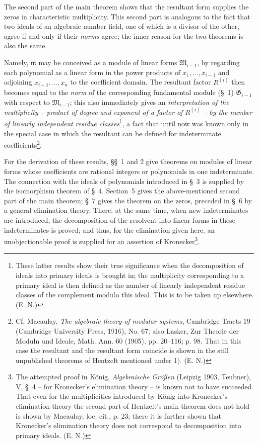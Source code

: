 \documentclass[11pt]{article}
\newcommand{\Gmod}{\mathfrak G}
\newcommand{\mideal}{\mathfrak m}
\begin{document}
The second part of the main theorem shows that the resultant form supplies the zeros in characteristic multiplicity. This second part is analogous to the fact that two ideals of an algebraic number field, one of which is a divisor of the other, agree if and only if their \emph{norms} agree; the inner reason for the two theorems is also the same.

Namely, $\mideal$ may be conceived as a module of linear forms $\mathfrak M_{i-1}$, by regarding each polynomial as a linear form in the power products of $x_1,\ldots,x_{i-1}$ and adjoining $x_{i+1},\ldots,x_n$ to the coefficient domain. The resultant factor $R^{(i)}$ then becomes equal to the \emph{norm} of the corresponding fundamental module (§~1) $\Gmod_{i-1}$ with respect to $\mathfrak M_{i-1}$; this also immediately gives an \emph{interpretation of the multiplicity -- product of degree and exponent of a factor of $R^{(i)}$ -- by the number of linearly independent residue classes}\footnote{These latter results show their true significance when the decomposition of ideals into primary ideals is brought in; the multiplicity corresponding to a primary ideal is then defined as the number of linearly independent residue classes of the complement modulo this ideal. This is to be taken up elsewhere. (E. N.)}, a fact that until now was known only in the special case in which the resultant can be defined for indeterminate coefficients\footnote{Cf. Macaulay, \emph{The algebraic theory of modular systems}, Cambridge Tracts 19 (Cambridge University Press, 1916), No. 67; also Lasker, Zur Theorie der Moduln und Ideale, Math. Ann. 60 (1905), pp. 20--116; p. 98. That in this case the resultant and the resultant form coincide is shown in the still unpublished theorems of Hentzelt mentioned under 1). (E. N.)}.

For the derivation of these results, §§~1 and 2 give theorems on modules of linear forms whose coefficients are rational integers or polynomials in one indeterminate. The connection with the ideals of polynomials introduced in §~3 is supplied by the isomorphism theorem of §~4. Section~5 gives the above-mentioned second part of the main theorem; §~7 gives the theorem on the zeros, preceded in §~6 by a general elimination theory. There, at the same time, when new indeterminates are introduced, the decomposition of the resolvent into linear forms in these indeterminates is proved; and thus, for the elimination given here, an unobjectionable proof is supplied for an assertion of Kronecker\footnote{The attempted proof in König, \emph{Algebraische Größen} (Leipzig 1903, Teubner), V, §~4 -- for Kronecker's elimination theory -- is known not to have succeeded. That even for the multiplicities introduced by König into Kronecker's elimination theory the second part of Hentzelt's main theorem does not hold is shown by Macaulay, loc. cit., p. 23; there it is further shown that Kronecker's elimination theory does not correspond to decomposition into primary ideals. (E. N.)}.
\end{document}
